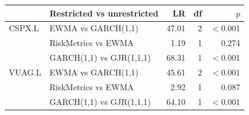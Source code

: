 \begin{tabular}{llrrr}
\toprule
 & Restricted vs unrestricted & LR & df & $p$ \\
\midrule
CSPX.L & EWMA vs GARCH(1,1) & 47.01 & 2 & $<$0.001 \\
 & RiskMetrics vs EWMA & 1.19 & 1 & 0.274 \\
 & GARCH(1,1) vs GJR(1,1,1) & 68.31 & 1 & $<$0.001 \\
\midrule
VUAG.L & EWMA vs GARCH(1,1) & 45.61 & 2 & $<$0.001 \\
 & RiskMetrics vs EWMA & 2.92 & 1 & 0.087 \\
 & GARCH(1,1) vs GJR(1,1,1) & 64.10 & 1 & $<$0.001 \\
\bottomrule
\end{tabular}